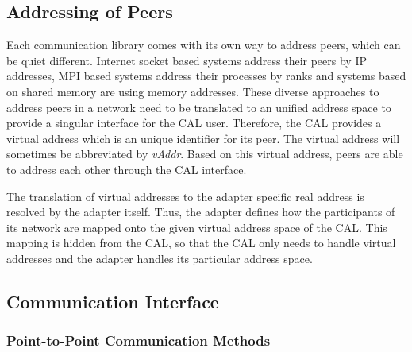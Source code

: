 \subsection{Addressing of Peers}
Each communication library comes with its own way to address peers,
which can be quiet different. Internet socket based systems address
their peers by IP addresses, MPI based systems address their processes
by ranks and systems based on shared memory are using memory
addresses.  These diverse approaches to address peers in a network
need to be translated to an unified address space to provide a
singular interface for the CAL user.  Therefore, the CAL provides a
virtual address which is an unique identifier for its peer. The
virtual address will sometimes be abbreviated by \emph{vAddr}.
 Based on this virtual address, peers are able
to address each other through the CAL interface.

The translation of virtual addresses to the adapter specific real
address is resolved by the adapter itself. Thus, the adapter defines
how the participants of its network are mapped onto the given virtual
address space of the CAL. This mapping is hidden from the CAL, so that
the CAL only needs to handle virtual addresses and the adapter handles
its particular address space.

\subsection{Communication Interface}
\label{sec:cal_comm}
\subsubsection*{Point-to-Point Communication Methods}

